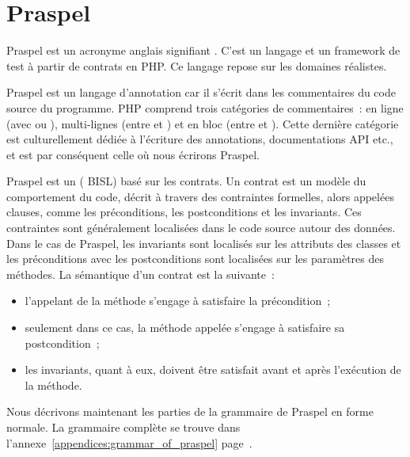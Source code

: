\def\gsep{$\quad::=\quad$}
\def\mvert{$\;\;|\;\;$}
\def\mvertp{\phantom{$\;\;|\;\;$}}
\newcommand{\gtoken}[1]{\underline{\code{php-#1}}}
\newcommand{\grule}[1]{\textit{#1}}

\section{Praspel}
\label{section:language:praspel}

Praspel est un acronyme anglais signifiant . C'est un langage et un framework de test à partir
de contrats en PHP. Ce langage repose sur les domaines réalistes.

Praspel est un {\strong langage d'annotation} car il s'écrit dans les
commentaires du code source du programme. PHP comprend trois catégories de
commentaires~: en ligne (avec \code{//} ou \code{\#}), multi-lignes (entre
\code{/*} et \code{*/}) et en bloc (entre \code{/**} et \code{*/}). Cette
dernière catégorie est culturellement dédiée à l'écriture des annotations,
documentations API etc., et est par conséquent celle où nous écrirons Praspel.

Praspel est un  ({\strong
BISL}) basé sur les contrats. Un {\strong contrat} est un modèle du comportement
du code, décrit à travers des contraintes formelles, alors appelées {\strong
clauses}, comme les préconditions, les postconditions et les invariants. Ces
contraintes sont généralement localisées dans le code source autour des données.
Dans le cas de Praspel, les invariants sont localisés sur les attributs des
classes et les préconditions avec les postconditions sont localisées sur les
paramètres des méthodes. La sémantique d'un contrat est la suivante~:

\begin{itemize}

\item l'appelant de la méthode s'engage à satisfaire la précondition~;

\item seulement dans ce cas, la méthode appelée s'engage à satisfaire sa
postcondition~;

\item les invariants, quant à eux, doivent être satisfait avant et après
l'exécution de la méthode.

\end{itemize}

Nous décrivons maintenant les parties de la grammaire de Praspel en forme
normale. La grammaire complète se trouve dans
l'annexe~\ref{appendices:grammar_of_praspel}
page~\pageref{appendices:grammar_of_praspel}.

